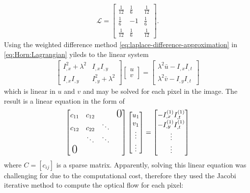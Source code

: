 \documentclass[letterpaper,11pt]{article}
\begin{document}
\begin{align}
\mathcal{L} = \begin{bmatrix}
\frac{1}{12} & \frac{1}{6} & \frac{1}{12} \\
\frac{1}{6} & -1 & \frac{1}{6} \\
\frac{1}{12} & \frac{1}{6} & \frac{1}{12} 
\end{bmatrix}.
\end{align}
Using the weighted difference method \eqref{eq:laplace-difference-approximation} in \eqref{eq:Horn:Lagrangian} yileds to the linear system 
\begin{align}
\begin{bmatrix}
I_{,x}^2 + \lambda^2 & I_{,x} I_{,y} \\
I_{,x} I_{,y} & I_{,y}^2 + \lambda^2
\end{bmatrix} \begin{bmatrix}
u \\
v
\end{bmatrix} = \begin{bmatrix}
\lambda^2 \bar{u} - I_{,x} I_{,t} \\
\lambda^2 \bar{v} - I_{,y} I_{,t}
\end{bmatrix}
\label{eq:Horn:lagrange-difference-approximation}
\end{align}
which is linear in $u$ and $v$ and may be solved for each pixel in the image. The result is a linear equation in the form of 
\begin{align}
\begin{bmatrix}
    c_{11} & c_{12} & &\textrm{\LARGE0} \\
c_{12}& c_{22} &\ddots &\\   
&  \ddots& \ddots & \\
    \text{\LARGE0}& & & 
\end{bmatrix}
\begin{bmatrix}
u_1\\
v_1\\
\vdots\\
\vdots
\end{bmatrix}
= \begin{bmatrix}
-I_{,x}^{(1)} I_{,t}^{(1)}\\
-I_{,y}^{(1)} I_{,t}^{(1)}\\
\vdots\\
\vdots\\
\end{bmatrix}
\end{align}
where $C = [c_{ij}]$ is a sparse matrix. Apparently, solving this linear equation was challenging for \citep{Horn:Schunck:1981} due to the computational cost, therefore they used the Jacobi iterative method to compute the optical flow for each pixel:
\end{document}
